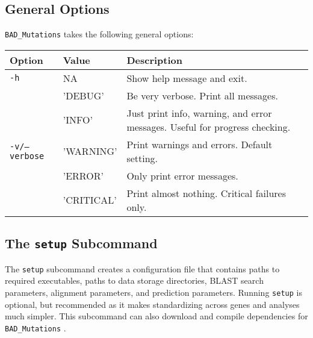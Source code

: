 \documentclass[12pt]{article}
\newcommand{\BM}{\texttt{BAD\_Mutations} }
\begin{document}
\subsection*{General Options}
\par \BM takes the following general options:
\begin{table}[h]
    \centering
    \begin{tabular}{p{105pt} l p{260pt}}
    \toprule
    Option & Value & Description \\
    \midrule
    \texttt{-h} & NA & Show help message and exit. \\
    \midrule
    & 'DEBUG' & Be very verbose. Print all messages.\\ \cmidrule{2-3}
    & 'INFO' & Just print info, warning, and error messages. Useful for progress checking.\\ \cmidrule{2-3}
    \texttt{-v/--verbose} & 'WARNING' & Print warnings and errors. Default setting. \\ \cmidrule{2-3}
    & 'ERROR' & Only print error messages. \\ \cmidrule{2-3}
    & 'CRITICAL' & Print almost nothing. Critical failures only. \\
    \bottomrule
    \end{tabular}
\end{table}
\subsection*{The \texttt{setup} Subcommand}
\par The \texttt{setup} subcommand creates a configuration file that contains
paths to required executables, paths to data storage directories, BLAST search
parameters, alignment parameters, and prediction parameters. Running
\texttt{setup} is optional, but recommended as it makes standardizing across
genes and analyses much simpler. This subcommand can also download and compile
dependencies for \BM.
\end{document}
